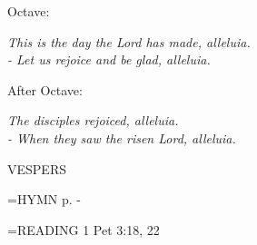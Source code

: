 \begin{center}
\end{center}Octave:\begin{center}\textit{	This is the day the Lord has made, alleluia.\\
- Let us rejoice and be glad, alleluia.}
\end{center}After Octave:\begin{center}\textit{	The disciples rejoiced, alleluia.\\
- When they saw the risen Lord, alleluia.}
\end{center}

\begin{flushleft}\normalsize VESPERS\\\end{flushleft}

\hangindent=\parindent \small{\uppercase{HYMN} p.  \pageref{easter:firstHymn} - \pageref{easter:lastHymn}\\}

\hangindent=\parindent \small{READING}    1 Pet 3:18, 22 \textbf{   \\}
